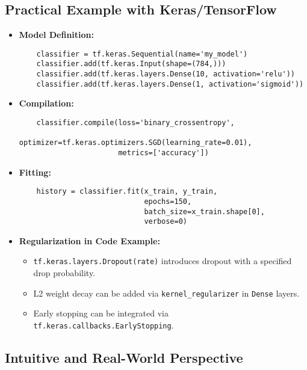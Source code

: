 \documentclass{article}
\begin{document}
\subsection{Practical Example with Keras/TensorFlow}

\begin{itemize}
    \item \textbf{Model Definition:}
    \begin{verbatim}
    classifier = tf.keras.Sequential(name='my_model')
    classifier.add(tf.keras.Input(shape=(784,)))
    classifier.add(tf.keras.layers.Dense(10, activation='relu'))
    classifier.add(tf.keras.layers.Dense(1, activation='sigmoid'))
    \end{verbatim}
    \item \textbf{Compilation:}
    \begin{verbatim}
    classifier.compile(loss='binary_crossentropy',
                       optimizer=tf.keras.optimizers.SGD(learning_rate=0.01),
                       metrics=['accuracy'])
    \end{verbatim}
    \item \textbf{Fitting:}
    \begin{verbatim}
    history = classifier.fit(x_train, y_train,
                             epochs=150,
                             batch_size=x_train.shape[0],
                             verbose=0)
    \end{verbatim}
    \item \textbf{Regularization in Code Example:} 
    \begin{itemize}
        \item \texttt{tf.keras.layers.Dropout(rate)} introduces dropout with a specified drop probability.
        \item L2 weight decay can be added via \texttt{kernel\_regularizer} in \texttt{Dense} layers.
        \item Early stopping can be integrated via \texttt{tf.keras.callbacks.EarlyStopping}.
    \end{itemize}
\end{itemize}

\subsection{Intuitive and Real-World Perspective}
\end{document}
